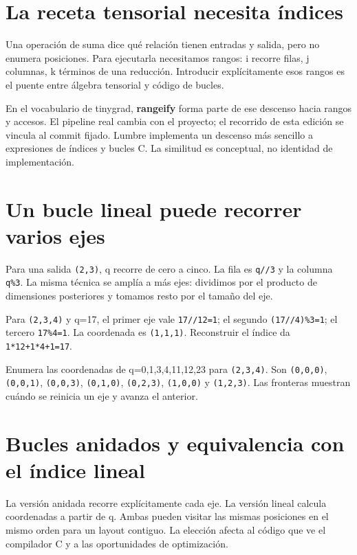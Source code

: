 \documentclass[12pt,a4paper,oneside]{report}
\begin{document}
\section{La receta tensorial necesita índices}
Una operación de suma dice qué relación tienen entradas y salida, pero no enumera posiciones. Para ejecutarla necesitamos rangos: i recorre filas, j columnas, k términos de una reducción. Introducir explícitamente esos rangos es el puente entre álgebra tensorial y código de bucles.

En el vocabulario de tinygrad, \textbf{rangeify} forma parte de ese descenso hacia rangos y accesos. El pipeline real cambia con el proyecto; el recorrido de esta edición se vincula al commit fijado. Lumbre implementa un descenso más sencillo a expresiones de índices y bucles C. La similitud es conceptual, no identidad de implementación. \cite{tinygrad-pin,tinygrad-codegen}

\section{Un bucle lineal puede recorrer varios ejes}
Para una salida \texttt{(2,3)}, q recorre de cero a cinco. La fila es \texttt{q//3} y la columna \texttt{q\%3}. La misma técnica se amplía a más ejes: dividimos por el producto de dimensiones posteriores y tomamos resto por el tamaño del eje.

Para \texttt{(2,3,4)} y q=17, el primer eje vale \texttt{17//12=1}; el segundo \texttt{(17//4)\%3=1}; el tercero \texttt{17\%4=1}. La coordenada es \texttt{(1,1,1)}. Reconstruir el índice da \texttt{1*12+1*4+1=17}.

\begin{ejemplo}
Enumera las coordenadas de q=0,1,3,4,11,12,23 para \texttt{(2,3,4)}. Son \texttt{(0,0,0)}, \texttt{(0,0,1)}, \texttt{(0,0,3)}, \texttt{(0,1,0)}, \texttt{(0,2,3)}, \texttt{(1,0,0)} y \texttt{(1,2,3)}. Las fronteras muestran cuándo se reinicia un eje y avanza el anterior.

\end{ejemplo}
\section{Bucles anidados y equivalencia con el índice lineal}
La versión anidada recorre explícitamente cada eje. La versión lineal calcula coordenadas a partir de q. Ambas pueden visitar las mismas posiciones en el mismo orden para un layout contiguo. La elección afecta al código que ve el compilador C y a las oportunidades de optimización.
\end{document}
